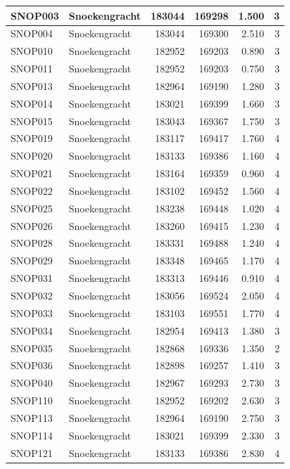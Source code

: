 \documentclass[11pt,]{book}
\begin{document}
\begin{table}
\begin{tabular}[t]{l|l|r|r|r|r}
\hline
SNOP003 & Snoekengracht & 183044 & 169298 & 1.500 & 3\\
\hline
SNOP004 & Snoekengracht & 183044 & 169300 & 2.510 & 3\\
\hline
SNOP010 & Snoekengracht & 182952 & 169203 & 0.890 & 3\\
\hline
SNOP011 & Snoekengracht & 182952 & 169203 & 0.750 & 3\\
\hline
SNOP013 & Snoekengracht & 182964 & 169190 & 1.280 & 3\\
\hline
SNOP014 & Snoekengracht & 183021 & 169399 & 1.660 & 3\\
\hline
SNOP015 & Snoekengracht & 183043 & 169367 & 1.750 & 3\\
\hline
SNOP019 & Snoekengracht & 183117 & 169417 & 1.760 & 4\\
\hline
SNOP020 & Snoekengracht & 183133 & 169386 & 1.160 & 4\\
\hline
SNOP021 & Snoekengracht & 183164 & 169359 & 0.960 & 4\\
\hline
SNOP022 & Snoekengracht & 183102 & 169452 & 1.560 & 4\\
\hline
SNOP025 & Snoekengracht & 183238 & 169448 & 1.020 & 4\\
\hline
SNOP026 & Snoekengracht & 183260 & 169415 & 1.230 & 4\\
\hline
SNOP028 & Snoekengracht & 183331 & 169488 & 1.240 & 4\\
\hline
SNOP029 & Snoekengracht & 183348 & 169465 & 1.170 & 4\\
\hline
SNOP031 & Snoekengracht & 183313 & 169446 & 0.910 & 4\\
\hline
SNOP032 & Snoekengracht & 183056 & 169524 & 2.050 & 4\\
\hline
SNOP033 & Snoekengracht & 183103 & 169551 & 1.770 & 4\\
\hline
SNOP034 & Snoekengracht & 182954 & 169413 & 1.380 & 3\\
\hline
SNOP035 & Snoekengracht & 182868 & 169336 & 1.350 & 2\\
\hline
SNOP036 & Snoekengracht & 182898 & 169257 & 1.410 & 3\\
\hline
SNOP040 & Snoekengracht & 182967 & 169293 & 2.730 & 3\\
\hline
SNOP110 & Snoekengracht & 182952 & 169202 & 2.630 & 3\\
\hline
SNOP113 & Snoekengracht & 182964 & 169190 & 2.750 & 3\\
\hline
SNOP114 & Snoekengracht & 183021 & 169399 & 2.330 & 3\\
\hline
SNOP121 & Snoekengracht & 183133 & 169386 & 2.830 & 4\\

\end{tabular}
\end{table}
\end{document}

